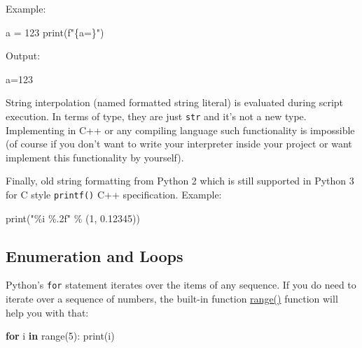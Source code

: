 \documentclass[
]{article}
\newenvironment{Shaded}{}{}
\newcommand{\BuiltInTok}[1]{#1}
\newcommand{\ControlFlowTok}[1]{\textcolor[rgb]{0.00,0.44,0.13}{\textbf{#1}}}
\newcommand{\DecValTok}[1]{\textcolor[rgb]{0.25,0.63,0.44}{#1}}
\newcommand{\FloatTok}[1]{\textcolor[rgb]{0.25,0.63,0.44}{#1}}
\newcommand{\KeywordTok}[1]{\textcolor[rgb]{0.00,0.44,0.13}{\textbf{#1}}}
\newcommand{\NormalTok}[1]{#1}
\newcommand{\OperatorTok}[1]{\textcolor[rgb]{0.40,0.40,0.40}{#1}}
\newcommand{\SpecialCharTok}[1]{\textcolor[rgb]{0.25,0.44,0.63}{#1}}
\newcommand{\SpecialStringTok}[1]{\textcolor[rgb]{0.73,0.40,0.53}{#1}}
\newcommand{\StringTok}[1]{\textcolor[rgb]{0.25,0.44,0.63}{#1}}
\begin{document}
Example:

\begin{Shaded}
\begin{Highlighting}[]
\NormalTok{a }\OperatorTok{=} \DecValTok{123}
\BuiltInTok{print}\NormalTok{(}\SpecialStringTok{f"}\SpecialCharTok{\{}\NormalTok{a}\OperatorTok{=}\SpecialCharTok{\}}\SpecialStringTok{"}\NormalTok{)}
\end{Highlighting}
\end{Shaded}

Output:

\begin{Shaded}
\begin{Highlighting}[]
\NormalTok{a}\OperatorTok{=}\DecValTok{123}
\end{Highlighting}
\end{Shaded}

String interpolation (named formatted string literal) is evaluated
during script execution. In terms of type, they are just \texttt{str}
and it's not a new type. Implementing in C++ or any compiling language
such functionality is impossible (of course if you don't want to write
your interpreter inside your project or want implement this
functionality by yourself).

Finally, old string formatting from Python 2 which is still supported in
Python 3 for C style \texttt{printf()} C++ specification. Example:

\begin{Shaded}
\begin{Highlighting}[]
\BuiltInTok{print}\NormalTok{(}\StringTok{"}\SpecialCharTok{\%i}\StringTok{ }\SpecialCharTok{\%.2f}\StringTok{"} \OperatorTok{\%}\NormalTok{ (}\DecValTok{1}\NormalTok{, }\FloatTok{0.12345}\NormalTok{))}
\end{Highlighting}
\end{Shaded}

\hypertarget{enumeration-and-loops}{%
\subsection{Enumeration and Loops}\label{enumeration-and-loops}}

Python's \texttt{for} statement iterates over the items of any sequence.
If you do need to iterate over a sequence of numbers, the built-in
function
\href{https://docs.python.org/3/library/stdtypes.html?highlight=range\#range}{range()}
function will help you with that:

\begin{Shaded}
\begin{Highlighting}[]
\ControlFlowTok{for}\NormalTok{ i }\KeywordTok{in} \BuiltInTok{range}\NormalTok{(}\DecValTok{5}\NormalTok{):}
    \BuiltInTok{print}\NormalTok{(i)}
\end{Highlighting}
\end{Shaded}
\end{document}
